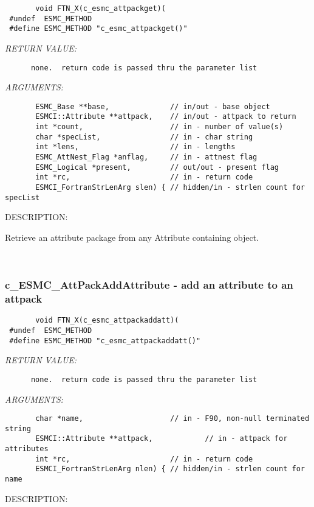   
\begin{verbatim}       void FTN_X(c_esmc_attpackget)(
 #undef  ESMC_METHOD
 #define ESMC_METHOD "c_esmc_attpackget()"\end{verbatim}{\em RETURN VALUE:}
\begin{verbatim}      none.  return code is passed thru the parameter list
   \end{verbatim}{\em ARGUMENTS:}
\begin{verbatim}       ESMC_Base **base,              // in/out - base object
       ESMCI::Attribute **attpack,    // in/out - attpack to return
       int *count,                    // in - number of value(s)
       char *specList,                // in - char string
       int *lens,                     // in - lengths
       ESMC_AttNest_Flag *anflag,     // in - attnest flag
       ESMC_Logical *present,         // out/out - present flag
       int *rc,                       // in - return code
       ESMCI_FortranStrLenArg slen) { // hidden/in - strlen count for specList
   \end{verbatim}
{\sf DESCRIPTION:\\ }


       Retrieve an attribute package from any Attribute containing object.
   
 
\mbox{}\hrulefill\ 
 
\subsubsection [c\_ESMC\_AttPackAddAttribute] {c\_ESMC\_AttPackAddAttribute - add an attribute to an attpack}


  
\begin{verbatim}       void FTN_X(c_esmc_attpackaddatt)(
 #undef  ESMC_METHOD
 #define ESMC_METHOD "c_esmc_attpackaddatt()"\end{verbatim}{\em RETURN VALUE:}
\begin{verbatim}      none.  return code is passed thru the parameter list
   \end{verbatim}{\em ARGUMENTS:}
\begin{verbatim}       char *name,                    // in - F90, non-null terminated string
       ESMCI::Attribute **attpack,            // in - attpack for attributes
       int *rc,                       // in - return code
       ESMCI_FortranStrLenArg nlen) { // hidden/in - strlen count for name
   \end{verbatim}
{\sf DESCRIPTION:\\ }


